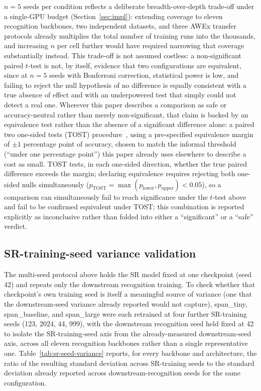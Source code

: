 \documentclass[11pt]{article}
\begin{document}
$n=5$ seeds per condition reflects a deliberate breadth-over-depth trade-off under a single-GPU budget (Section~\ref{sec:impl}): extending coverage to eleven recognition backbones, two independent datasets, and three AWEx transfer protocols already multiplies the total number of training runs into the thousands, and increasing $n$ per cell further would have required narrowing that coverage substantially instead. This trade-off is not assumed costless: a non-significant paired $t$-test is not, by itself, evidence that two configurations are equivalent, since at $n=5$ seeds with Bonferroni correction, statistical power is low, and failing to reject the null hypothesis of no difference is equally consistent with a true absence of effect and with an underpowered test that simply could not detect a real one. Wherever this paper describes a comparison as safe or accuracy-neutral rather than merely non-significant, that claim is backed by an equivalence test rather than the absence of a significant difference alone: a paired two one-sided tests (TOST) procedure~\cite{schuirmann1987tost,lakens2017equivalence}, using a pre-specified equivalence margin of $\pm 1$ percentage point of accuracy, chosen to match the informal threshold (``under one percentage point'') this paper already uses elsewhere to describe a cost as small. TOST tests, in each one-sided direction, whether the true paired difference exceeds the margin; declaring equivalence requires rejecting both one-sided nulls simultaneously ($p_{\text{TOST}} = \max(p_{\text{lower}}, p_{\text{upper}}) < 0.05$), so a comparison can simultaneously fail to reach significance under the $t$-test above and fail to be confirmed equivalent under TOST; this combination is reported explicitly as inconclusive rather than folded into either a ``significant'' or a ``safe'' verdict.

\subsection{SR-training-seed variance validation}
\label{sec:sr-seed-variance}

The multi-seed protocol above holds the SR model fixed at one checkpoint (seed 42) and repeats only the downstream recognition training. To check whether that checkpoint's own training seed is itself a meaningful source of variance (one that the downstream-seed variance already reported would not capture), span\_tiny, span\_baseline, and span\_large were each retrained at four further SR-training seeds (123, 2024, 44, 999), with the downstream recognition seed held fixed at 42 to isolate the SR-training-seed axis from the already-measured downstream-seed axis, across all eleven recognition backbones rather than a single representative one. Table~\ref{tab:sr-seed-variance} reports, for every backbone and architecture, the ratio of the resulting standard deviation across SR-training seeds to the standard deviation already reported across downstream-recognition seeds for the same configuration.
\end{document}
